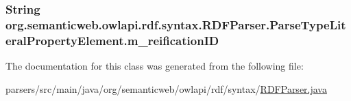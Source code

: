 \hypertarget{classorg_1_1semanticweb_1_1owlapi_1_1rdf_1_1syntax_1_1_r_d_f_parser_1_1_parse_type_literal_property_element_aefdda18ebf2ad88965f836b14b8d548f}{
\subsubsection[{m\-\_\-reification\-I\-D}]{\setlength{\rightskip}{0pt plus 5cm}String org.\-semanticweb.\-owlapi.\-rdf.\-syntax.\-R\-D\-F\-Parser.\-Parse\-Type\-Literal\-Property\-Element.\-m\-\_\-reification\-I\-D\hspace{0.3cm}{\ttfamily [protected]}}}\label{classorg_1_1semanticweb_1_1owlapi_1_1rdf_1_1syntax_1_1_r_d_f_parser_1_1_parse_type_literal_property_element_aefdda18ebf2ad88965f836b14b8d548f}


The documentation for this class was generated from the following file\-:\begin{DoxyCompactItemize}
\item 
parsers/src/main/java/org/semanticweb/owlapi/rdf/syntax/\hyperlink{_r_d_f_parser_8java}{R\-D\-F\-Parser.\-java}\end{DoxyCompactItemize}
